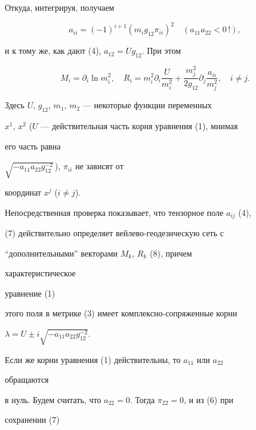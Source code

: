 Откуда, интегрируя, получаем 


\begin{equation} 


a_{ii}=(-1)^{i+1}(m_i g_{12}\pi_{ii})^2\quad 


(a_{11}a_{22}<0\,!), 


\end{equation} 


и к тому же, как дают (4), $a_{12}=U g_{12}$. При этом 


\begin{equation} 


M_i=\partial_i\ln m^2_i,\quad 


R_i=m^2_i\partial_i\frac{U}{m^2_i}+ 


\frac{m^2_j}{2g_{12}}\partial_j\frac{a_{ii}}{m^2_j}, 


\quad i\ne j. 


\end{equation} 


Здесь $U$, $g_{12}$, $m_1$, $m_2$ --- некоторые функции переменных 


$x^1$, $x^2$ ($U$ --- действительная часть корня уравнения (1), мнимая 


его часть равна  


$\sqrt{-a_{11}a_{22}g^{-2}_{12}}\,$), $\pi_{ii}$ не зависят от 


координат $x^j$ ($i\ne j$). 


 


Непосредственная проверка показывает, что тензорное поле $a_{ij}$ (4),  


(7) действительно определяет вейлево-геодезическую сеть с 


``дополнительными'' векторами $M_k$, $R_k$ (8), причем 


характеристическое 


уравнение (1) 


этого поля в метрике (3) имеет комплексно-сопряженные корни 


$\lambda=U\pm i\sqrt{-a_{11}a_{22}g^{-2}_{12}}$. 


 


Если же корни уравнения (1) действительны, то $a_{11}$ или $a_{22}$ 


обращаются  


в нуль. Будем считать, что $a_{22}=0$. Тогда $\pi_{22}=0$, и из (6) при 


сохранении (7) 



